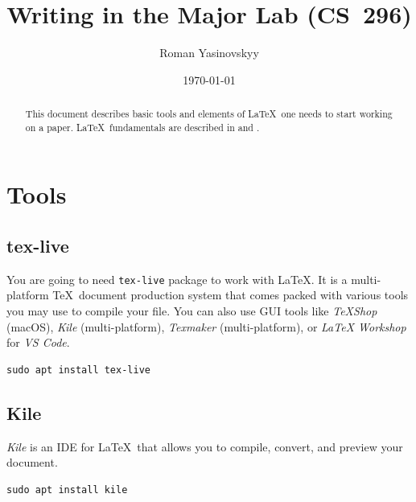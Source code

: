 \documentclass[nonacm]{acmart}
\title{Writing in the Major Lab (CS\ 296)}
\author{Roman Yasinovskyy}
\affiliation{
    \institution{Luther College}
    \streetaddress{700 College Dr}
    \city{Decorah}
    \state{Iowa}
    \country{United States}
    \postcode{52101}
}
\date{\today}
\begin{document}
\begin{abstract}

    This document describes basic tools and elements of \LaTeX\ one needs to start
    working on a paper. \LaTeX\ fundamentals are described in
    \cite{OverleafTutorial} and \cite{oetiker1995not}.

\end{abstract}

\maketitle


\section{Tools}

\subsection{tex-live}

You are going to need \texttt{tex-live} package to work with \LaTeX. It is a
multi-platform \TeX\ document production system\cite{TeXLive} that comes packed
with various tools you may use to compile your file. You can also use GUI tools
like \emph{TeXShop} (macOS), \emph{Kile} (multi-platform), \emph{Texmaker}
(multi-platform), or \emph{LaTeX Workshop} for \emph{VS Code}.

\begin{lstlisting}[caption=Installing tex-live, captionpos=b, frame=trbl]
sudo apt install tex-live
\end{lstlisting}

\subsection{Kile}

\emph{Kile} is an IDE for \LaTeX\ that allows you to compile, convert, and preview your document.

\begin{lstlisting}[caption=Installing Kile, captionpos=b, frame=trbl]
sudo apt install kile
\end{lstlisting}
\end{document}
